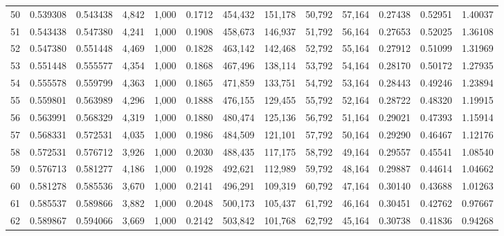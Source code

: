 \begin{tabular}{rrrrrrrrrrrrr}
50  &  0.539308 &  0.543438 &   4,842 &  1,000 &                                     0.1712 &  454,432 &  151,178 &   50,792 &   57,164 &  0.27438 &  0.52951 &  1.40037 \\
51  &  0.543438 &  0.547380 &   4,241 &  1,000 &                                     0.1908 &  458,673 &  146,937 &   51,792 &   56,164 &  0.27653 &  0.52025 &  1.36108 \\
52  &  0.547380 &  0.551448 &   4,469 &  1,000 &                                     0.1828 &  463,142 &  142,468 &   52,792 &   55,164 &  0.27912 &  0.51099 &  1.31969 \\
53  &  0.551448 &  0.555577 &   4,354 &  1,000 &                                     0.1868 &  467,496 &  138,114 &   53,792 &   54,164 &  0.28170 &  0.50172 &  1.27935 \\
54  &  0.555578 &  0.559799 &   4,363 &  1,000 &                                     0.1865 &  471,859 &  133,751 &   54,792 &   53,164 &  0.28443 &  0.49246 &  1.23894 \\
55  &  0.559801 &  0.563989 &   4,296 &  1,000 &                                     0.1888 &  476,155 &  129,455 &   55,792 &   52,164 &  0.28722 &  0.48320 &  1.19915 \\
56  &  0.563991 &  0.568329 &   4,319 &  1,000 &                                     0.1880 &  480,474 &  125,136 &   56,792 &   51,164 &  0.29021 &  0.47393 &  1.15914 \\
57  &  0.568331 &  0.572531 &   4,035 &  1,000 &                                     0.1986 &  484,509 &  121,101 &   57,792 &   50,164 &  0.29290 &  0.46467 &  1.12176 \\
58  &  0.572531 &  0.576712 &   3,926 &  1,000 &                                     0.2030 &  488,435 &  117,175 &   58,792 &   49,164 &  0.29557 &  0.45541 &  1.08540 \\
59  &  0.576713 &  0.581277 &   4,186 &  1,000 &                                     0.1928 &  492,621 &  112,989 &   59,792 &   48,164 &  0.29887 &  0.44614 &  1.04662 \\
60  &  0.581278 &  0.585536 &   3,670 &  1,000 &                                     0.2141 &  496,291 &  109,319 &   60,792 &   47,164 &  0.30140 &  0.43688 &  1.01263 \\
61  &  0.585537 &  0.589866 &   3,882 &  1,000 &                                     0.2048 &  500,173 &  105,437 &   61,792 &   46,164 &  0.30451 &  0.42762 &  0.97667 \\
62  &  0.589867 &  0.594066 &   3,669 &  1,000 &                                     0.2142 &  503,842 &  101,768 &   62,792 &   45,164 &  0.30738 &  0.41836 &  0.94268 \\

\end{tabular}
